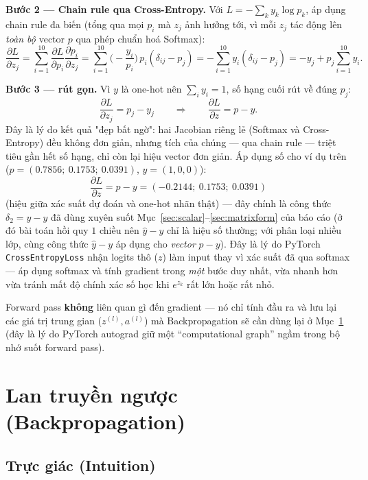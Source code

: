 \documentclass[12pt,a4paper]{report}
\begin{document}
\textbf{Bước 2 --- Chain rule qua Cross-Entropy.} Với
$L=-\sum_k y_k\log p_k$, áp dụng chain rule đa biến (tổng qua mọi $p_i$ mà
$z_j$ ảnh hưởng tới, vì mỗi $z_j$ tác động lên \emph{toàn bộ} vector $p$
qua phép chuẩn hoá Softmax):
$$\frac{\partial L}{\partial z_j} = \sum_{i=1}^{10}\frac{\partial L}{\partial p_i}\frac{\partial p_i}{\partial z_j}
= \sum_{i=1}^{10}\Big(-\frac{y_i}{p_i}\Big)\,p_i(\delta_{ij}-p_j)
= -\sum_{i=1}^{10} y_i(\delta_{ij}-p_j)
= -y_j + p_j\sum_{i=1}^{10}y_i.$$

\textbf{Bước 3 --- rút gọn.} Vì $y$ là one-hot nên $\sum_i y_i=1$, số hạng
cuối rút về đúng $p_j$:
$$\boxed{\frac{\partial L}{\partial z_j} = p_j - y_j} \qquad\Longrightarrow\qquad \frac{\partial L}{\partial z} = p - y.$$
Đây là lý do kết quả "đẹp bất ngờ": hai Jacobian riêng lẻ (Softmax và
Cross-Entropy) đều không đơn giản, nhưng tích của chúng --- qua chain rule
--- triệt tiêu gần hết số hạng, chỉ còn lại hiệu vector đơn giản. Áp dụng
số cho ví dụ trên ($p=(0.7856;\ 0.1753;\ 0.0391)$, $y=(1,0,0)$):
$$\frac{\partial L}{\partial z} = p - y = (-0.2144;\ 0.1753;\ 0.0391)$$
(hiệu giữa xác suất dự đoán và one-hot nhãn thật) --- đây chính là công
thức $\delta_2=\hat y-y$ đã dùng xuyên suốt Mục~\ref{sec:scalar}--\ref{sec:matrixform}
của báo cáo (ở đó bài toán hồi quy $1$ chiều nên $\hat y-y$ chỉ là hiệu
số thường; với phân loại nhiều lớp, cùng công thức $\hat y-y$ áp dụng cho
\emph{vector} $p-y$). Đây là lý do PyTorch \texttt{CrossEntropyLoss} nhận
logits thô ($z$) làm input thay vì xác suất đã qua softmax --- áp dụng
softmax và tính gradient trong \emph{một} bước duy nhất, vừa nhanh hơn
vừa tránh mất độ chính xác số học khi $e^{z_k}$ rất lớn hoặc rất nhỏ.

Forward pass \textbf{không} liên quan gì đến gradient --- nó chỉ tính đầu
ra và lưu lại các giá trị trung gian ($z^{(l)}, a^{(l)}$) mà Backpropagation
sẽ cần dùng lại ở Mục~\ref{sec:backprop} (đây là lý do PyTorch autograd giữ
một ``computational graph'' ngầm trong bộ nhớ suốt forward pass).

\section{Lan truyền ngược (Backpropagation)}
\label{sec:backprop}

\subsection{Trực giác (Intuition)}
\end{document}
